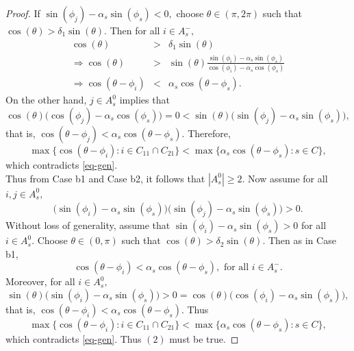 \documentclass{amsart}
\theoremstyle{definition}
\theoremstyle{remark}
\numberwithin{equation}{section}
\begin{document}
\begin{proof}
	If $\sin(\phi_j)- \alpha_s\sin(\phi_s)<0,$ choose $\theta\in (\pi,2\pi)$ such that $\cos(\theta)>\delta_1 \sin(\theta).$  Then for all $i\in A_{s}^-,$
	\begin{eqnarray*}
		\cos(\theta)&>&\delta_1 \sin(\theta)\\
		\Rightarrow \cos(\theta)&>& \sin(\theta) \frac{\sin(\phi_i)-\alpha_s \sin(\phi_s)}{\cos(\phi_i)-\alpha_s \cos(\phi_s)}\\
		\Rightarrow \cos(\theta-\phi_i)&<&\alpha_s\cos(\theta-\phi_s).
	\end{eqnarray*}
	On the other hand,  $j\in A_s^0$ implies that 
	\[ \cos(\theta)\Big(\cos(\phi_j)-\alpha_s\cos(\phi_s)\Big)=0<\sin(\theta) \Big(\sin(\phi_j)-\alpha_s \sin(\phi_s)\Big),\]
	that is, $\cos(\theta-\phi_j)<\alpha_s\cos(\theta-\phi_s).$ Therefore, 
	\[\max\{\cos(\theta-\phi_i):i\in C_{11}\cap C_{21}\}<\max\{\alpha_s\cos(\theta-\phi_s):s\in C\},\]
	which contradicts \eqref{eq-gen}.\\
	Thus from Case b1 and Case b2, it follows that $|A_s^0|\geq 2.$ Now assume for all $i,j\in A_s^0,$
	$$\Big(\sin(\phi_i)-\alpha_s\sin(\phi_s)\Big)\Big(\sin(\phi_j)-\alpha_s\sin(\phi_s)\Big)>0.$$ Without loss of generality, assume that $\sin(\phi_i)-\alpha_s\sin(\phi_s)>0$ for all $i\in A_s^0.$ Choose $\theta\in (0,\pi)$ such that $\cos(\theta)>\delta_2 \sin(\theta).$ Then as in Case b1, 
	\[\cos(\theta-\phi_i)<\alpha_s\cos(\theta-\phi_s), \text{ for all } i\in A_s^-. \]
	Moreover, for all $i\in A_s^0,$
	\[\sin(\theta)\Big(\sin(\phi_i)-\alpha_s\sin(\phi_s)\Big)>0 =\cos(\theta)\Big(\cos(\phi_i)-\alpha_s\sin(\phi_s)\Big),\]
	that is, $\cos(\theta-\phi_i)<\alpha_s\cos(\theta-\phi_s).$ Thus
	\[\max\{\cos(\theta-\phi_i):i\in C_{11}\cap C_{21}\}<\max\{\alpha_s\cos(\theta-\phi_s): s\in C\},\]
	which contradicts \eqref{eq-gen}. Thus $(2)$ must be true.
\end{proof}
\end{document}
